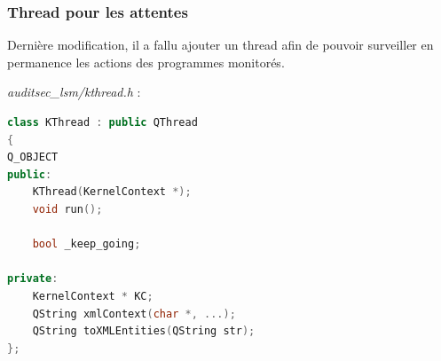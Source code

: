 \documentclass[pdftex,a4paper,titlepage,11pt]{article}
\begin{document}
\subsubsection{Thread pour les attentes}

Dernière modification, il a fallu ajouter un thread afin de pouvoir surveiller en permanence les actions des programmes monitorés.

\textit{auditsec\_lsm/kthread.h} : 
\begin{lstlisting}[language=C++]
class KThread : public QThread
{
Q_OBJECT
public:
	KThread(KernelContext *);
	void run();

	bool _keep_going;

private:
	KernelContext * KC;
	QString xmlContext(char *, ...);
	QString toXMLEntities(QString str);
};
\end{lstlisting}
\end{document}
